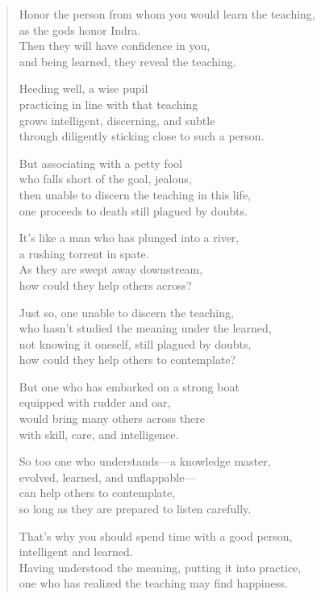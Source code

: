\documentclass[12pt,openany]{book}%
\begin{document}
\begin{verse}%
Honor the person from whom you would learn the teaching, \\
as the gods honor Indra. \\
Then they will have confidence in you, \\
and being learned, they reveal the teaching. 

Heeding well, a wise pupil \\
practicing in line with that teaching \\
grows intelligent, discerning, and subtle \\
through diligently sticking close to such a person. 

But associating with a petty fool \\
who falls short of the goal, jealous, \\
then unable to discern the teaching in this life, \\
one proceeds to death still plagued by doubts. 

It’s like a man who has plunged into a river, \\
a rushing torrent in spate. \\
As they are swept away downstream, \\
how could they help others across? 

Just so, one unable to discern the teaching, \\
who hasn’t studied the meaning under the learned, \\
not knowing it oneself, still plagued by doubts, \\
how could they help others to contemplate? 

But one who has embarked on a strong boat \\
equipped with rudder and oar, \\
would bring many others across there \\
with skill, care, and intelligence. 

So too one who understands—a knowledge master, \\
evolved, learned, and unflappable—\\
can help others to contemplate, \\
so long as they are prepared to listen carefully. 

That’s why you should spend time with a good person, \\
intelligent and learned. \\
Having understood the meaning, putting it into practice, \\
one who has realized the teaching may find happiness. 

%
\end{verse}
\end{document}
